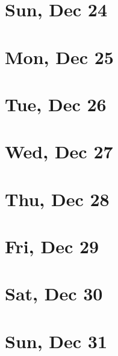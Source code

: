 	\section{Sun, Dec 24}
		
	\section{Mon, Dec 25}
		
	\section{Tue, Dec 26}
		
	\section{Wed, Dec 27}
		
	\section{Thu, Dec 28}
		
	\section{Fri, Dec 29}
		
	\section{Sat, Dec 30}
		
	\section{Sun, Dec 31}
		
